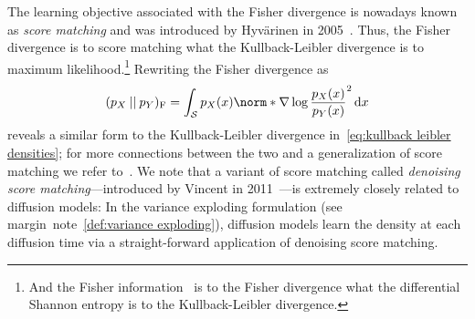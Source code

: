 The learning objective associated with the Fisher divergence is nowadays known as \emph{score matching} and was introduced by Hyvärinen in 2005~\cite{hyvarinen_estimation_2005}.
Thus, the Fisher divergence is to score matching what the Kullback-Leibler divergence is to maximum likelihood.\footnote{%
	And the Fisher information~\cite[chapter 2, eq. (5.10)]{Lehmann1998-xw} is to the Fisher divergence what the differential Shannon entropy is to the Kullback-Leibler divergence.
}
Rewriting the Fisher divergence as
\begin{equation}
	\Fisher{\DensityFunction_{X}}{\DensityFunction_{Y}} = \int_{\ASet} \DensityFunction_{X}(x) \norm*{\nabla \log \frac{\DensityFunction_{X}(x)}{\DensityFunction_{Y}(x)}}^{\num{2}}\,\mathrm{d}x
\end{equation}
reveals a similar form to the Kullback-Leibler divergence in~\cref{eq:kullback leibler densities}; for more connections between the two and a generalization of score matching we refer to~\cite{lyu_interpretation_2009}.
We note that a variant of score matching called \emph{denoising score matching}---introduced by Vincent in 2011~\cite{vincent_connection_2011}---is extremely closely related to diffusion models:
In the variance exploding formulation (see margin~note~\ref{def:variance exploding}), diffusion models learn the density at each diffusion time via a straight-forward application of denoising score matching.
